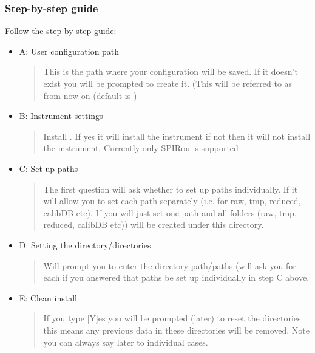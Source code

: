 \documentclass[a4paper,10pt,english]{report}
\begin{document}
\subsubsection{Step-by-step guide}
\label{\detokenize{user/general/installation:step-by-step-guide}}
Follow the step-by-step guide:
\begin{itemize}
\item {} 
A: User configuration path
\begin{quote}

This is the path where your configuration will be saved. If it doesn’t exist you will be prompted to create it. (This will be referred to as {\hyperref[\detokenize{misc/glossary:term-drs-uconfig}]{}}
from now on (default is )
\end{quote}

\item {} 
B: Instrument settings
\begin{quote}

Install {\hyperref[\detokenize{misc/glossary:term-instrument}]{}}.
If yes it will install the instrument if not then it will not install the instrument. Currently only SPIRou is supported
\end{quote}

\item {} 
C: Set up paths
\begin{quote}

The first question will ask  whether to set up paths individually. If 
it will allow you to set each path separately (i.e. for raw, tmp, reduced, calibDB etc). If 
you will just set one path and all folders (raw, tmp, reduced, calibDB etc)) will be created under this directory.
\end{quote}

\item {} 
D: Setting the directory/directories
\begin{quote}

Will prompt you to enter the directory path/paths (will ask you for each if you answered that paths be set up individually in step C above.
\end{quote}

\item {} 
E: Clean install
\begin{quote}

If you type {[}Y{]}es you will be prompted (later) to reset the directories this means any previous data in these directories will be removed. Note you can always say later to individual cases.
\end{quote}

\end{itemize}
\end{document}
